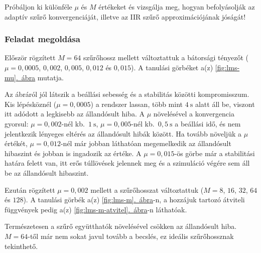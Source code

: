\documentclass[12pt,a4paper]{article}
\newcommand{\abrara}[1]{\hyperref[#1]{\ref*{#1}.~ábra}}
\begin{document}
Próbáljon ki különféle $\mu$ és $M$ értékeket és vizsgálja meg, hogyan befolyásolják az adaptív szűrő konvergenciáját, illetve az IIR szűrő approximációjának jóságát!

\subsubsection*{Feladat megoldása}

Először rögzített $M = 64$ szűrőhossz mellett változtattuk a bátorsági tényezőt ($\mu = 0{,}0005$, $0{,}002$, $0{,}005$, $0{,}012$ és $0{,}015$). A tanulási görbéket a(z) \abrara{fig:lms-mu} mutatja.


Az ábráról jól látszik a beállási sebesség és a stabilitás közötti kompromisszum. Kis lépésköznél ($\mu = 0{,}0005$) a rendszer lassan, több mint $4~\mathrm{s}$ alatt áll be, viszont itt adódott a legkisebb az állandósult hiba. A $\mu$ növelésével a konvergencia gyorsul: $\mu = 0{,}002$-nél kb.~$1~\mathrm{s}$, $\mu = 0{,}005$-nél kb.~$0{,}5~\mathrm{s}$ a beállási idő, és nem jelentkezik lényeges eltérés az állandósult hibák között. Ha tovább növeljük a $\mu$ értékét, $\mu = 0{,}012$-nél már jobban láthatóan megemelkedik az állandósult hibaszint és jobban is ingadozik az értéke. A $\mu = 0{,}015$-ös görbe már a stabilitási határa felett van, itt erős túllövések jelennek meg és a szimuláció végére sem áll be az állandósult hibaszint.\par\medskip
\newpage

Ezután rögzített $\mu = 0{,}002$ mellett a szűrőhosszat változtattuk ($M = 8$, $16$, $32$, $64$ és $128$). A tanulási görbék a(z) \abrara{fig:lms-m}-n, a hozzájuk tartozó átviteli függvények pedig a(z) \abrara{fig:lms-m-atvitel}-n láthatóak.



Természetesen a szűrő együtthatók növelésével csökken az állandósult hiba. $M = 64$-től már nem sokat javul tovább a becslés, ez ideális szűrőhossznak tekinthető.

\newpage
\end{document}
